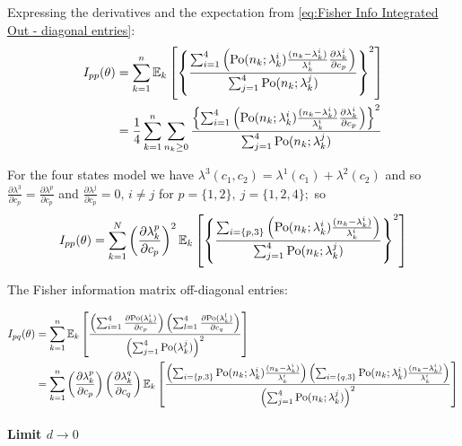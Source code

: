 Expressing the derivatives and the expectation from \autoref{eq:Fisher Info Integrated Out - diagonal entries}:
%
\begin{alignat*}{1}
	I_{pp}(\theta) & =\sum_{k=1}^n\mathbb{E}_k\left[\left\{ \frac{\sum_{i=1}^4\left(\mathrm{Po}(n_k;\lambda_k^i)\frac{(n_k-\lambda_k^i)}{\lambda_k^i}\frac{\partial\lambda_k^i}{\partial c_p}\right)}{\sum_{j=1}^4\mathrm{Po}(n_k;\lambda_k^j)}\right\} ^2\right]\\
	 & =\frac{1}{4}\sum_{k=1}^n\sum_{n_k\geq0}\frac{\left\{ \sum_{i=1}^4\left(\mathrm{Po}(n_k;\lambda_k^i)\frac{(n_k-\lambda_k^i)}{\lambda_k^i}\frac{\partial\lambda_k^i}{\partial c_p}\right)\right\} ^2}{\sum_{j=1}^4\mathrm{Po}(n_k;\lambda_k^j)}
\end{alignat*}

For the four states model we have $\lambda^3(c_1,c_2)=\lambda^1(c_1)+\lambda^2(c_2)$ and so $\frac{\partial\lambda^3}{\partial c_p}=\frac{\partial\lambda^p}{\partial c_p}$ and $\frac{\partial\lambda^j}{\partial c_p}=0,\, i\neq j$ for $p=\{1,2\},\: j=\{1,2,4\};$ so 
%
\begin{equation}
	I_{pp}(\theta) =\sum_{k=1}^N\left(\frac{\partial\lambda_k^p}{\partial c_p}\right)^2\mathbb{E}_k\left[\left\{ \frac{\sum_{i=\{p,3\}}\left(\mathrm{Po}(n_k;\lambda_k^i)\frac{(n_k-\lambda_k^i)}{\lambda_k^i}\right)}{\sum_{j=1}^4\mathrm{Po}(n_k;\lambda_k^j)}\right\} ^2\right]
\end{equation}

The Fisher information matrix off-diagonal entries:

\begin{alignat}{1}
	I_{pq}(\theta) & =\sum_{k=1}^n\mathbb{E}_k\left[\frac{\left(\sum_{i=1}^4\frac{\partial\mathrm{Po}(\lambda_k^i)}{\partial c_p}\right)\left(\sum_{l=1}^4\frac{\partial\mathrm{Po}(\lambda_k^{l})}{\partial c_q}\right)}{\left(\sum_{j=1}^4\mathrm{Po}(\lambda_k^j)\right)^2}\right]\nonumber \\
	 & =\sum_{k=1}^n\left(\frac{\partial\lambda_k^p}{\partial c_p}\right)\left(\frac{\partial\lambda_k^q}{\partial c_q}\right)\mathbb{E}_k\left[\frac{\left(\sum_{i=\{p,3\}}\mathrm{Po}(n_k;\lambda_k^i)\frac{(n_k-\lambda_k^i)}{\lambda_k^i}\right)\left(\sum_{i=\{q,3\}}\mathrm{Po}(n_k;\lambda_k^i)\frac{(n_k-\lambda_k^i)}{\lambda_k^i}\right)}{\left(\sum_{j=1}^4\mathrm{Po}(n_k;\lambda_k^j)\right)^2}\right]
	 \label{eq:Fisher Info Integrated Out-off diagonal entries}
\end{alignat}

\paragraph{Limit $d\rightarrow0$}

